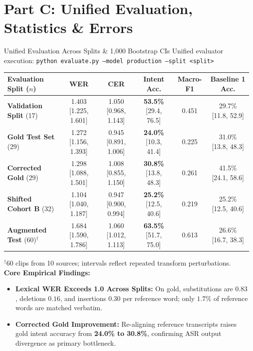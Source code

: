 \documentclass[10pt]{beamer}
\begin{document}
\section{Part C: Unified Evaluation, Statistics \& Errors}

\begin{frame}{Unified Evaluation Across Splits \& 1,000 Bootstrap CIs}
    \footnotesize
    Unified evaluator execution: \texttt{python evaluate.py --model production --split <split>}\\[3pt]

    \begin{table}[htbp]
    \centering
    \tiny
    \begin{tabular}{lccccc}
        \toprule
        \textbf{Evaluation Split ($n$)} & \textbf{WER} & \textbf{CER} & \textbf{Intent Acc.} & \textbf{Macro-F1} & \textbf{Baseline 1 Acc.} \\
        \midrule
        \textbf{Validation Split} (17) & 1.403 [1.225, 1.601] & 1.050 [0.968, 1.143] & \textbf{53.5\%} [29.4, 76.5] & 0.451 & 29.7\% [11.8, 52.9] \\
        \textbf{Gold Test Set} (29) & 1.272 [1.156, 1.393] & 0.945 [0.891, 1.006] & \textbf{24.0\%} [10.3, 41.4] & 0.225 & 31.0\% [13.8, 48.3] \\
        \textbf{Corrected Gold} (29) & 1.298 [1.088, 1.501] & 1.008 [0.855, 1.150] & \textbf{30.8\%} [13.8, 48.3] & 0.261 & 41.5\% [24.1, 58.6] \\
        \textbf{Shifted Cohort B} (32) & 1.104 [1.040, 1.187] & 0.947 [0.900, 0.994] & \textbf{25.2\%} [12.5, 40.6] & 0.219 & 25.2\% [12.5, 40.6] \\
        \textbf{Augmented Test} (60)$^\dagger$ & 1.684 [1.590, 1.786] & 1.060 [1.012, 1.113] & \textbf{63.5\%} [51.7, 75.0] & 0.613 & 26.6\% [16.7, 38.3] \\
        \bottomrule
    \end{tabular}
    \end{table}
    {\tiny $^\dagger$60 clips from 10 sources; intervals reflect repeated transform perturbations.}\\[3pt]

    \textbf{Core Empirical Findings:}
    \begin{itemize}\setlength{\itemsep}{2pt}
        \item \textbf{Lexical WER Exceeds 1.0 Across Splits:} On gold, substitutions are $0.83$, deletions $0.16$, and insertions $0.30$ per reference word; only $1.7\%$ of reference words are matched verbatim.
        \item \textbf{Corrected Gold Improvement:} Re-aligning reference transcripts raises gold intent accuracy from \textbf{24.0\% to 30.8\%}, confirming ASR output divergence as primary bottleneck.
    \end{itemize}
\end{frame}
\end{document}
